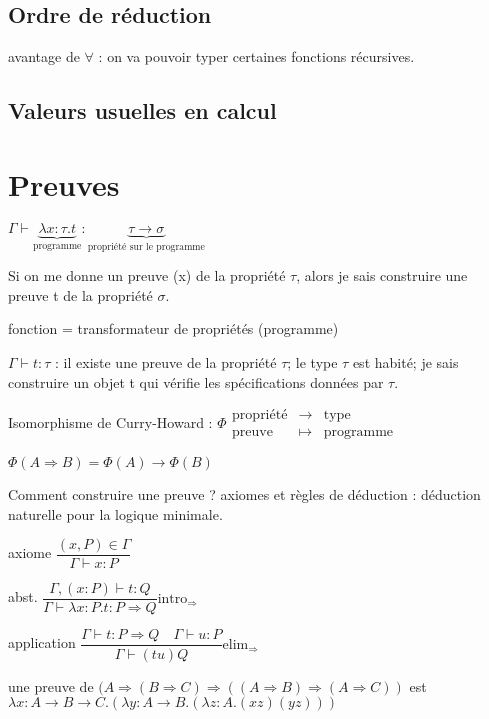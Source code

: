 \documentclass[10pt,a4paper]{article}
\begin{document}
\subsection{Ordre de réduction}
avantage de $\forall$ : on va pouvoir typer certaines fonctions récursives.

\subsection{Valeurs usuelles en \lambda calcul}

\section{Preuves}
$
\Gamma \vdash \underbrace{\lambda x : \tau . t}_{\text{programme}} : \underbrace{\tau → \sigma}_{\text{propriété sur le programme}}$

Si on me donne un preuve (x) de la propriété $\tau$, alors je sais construire une preuve t de la propriété $\sigma$.

fonction = transformateur de propriétés (programme)

$\Gamma \vdash t  : \tau$  : il existe une preuve de la propriété $\tau$; le type  $\tau$ est habité; je sais construire un objet t qui vérifie les spécifications données par $\tau$.

Isomorphisme de Curry-Howard :
$\Phi
\begin{array}{lll}
\text{propriété}& → & \text{type} \\
\text{preuve} &\mapsto&  \text{programme}
\end{array}$

$\Phi(A \Rightarrow B) = \Phi(A) → \Phi(B)$

Comment construire une preuve ?
axiomes et règles de déduction : déduction naturelle pour la logique minimale.

axiome $\dfrac{(x,P) \in \Gamma}{\Gamma \vdash x: P}$

abst. $\dfrac{\Gamma, (x:P) \vdash t:Q}{\Gamma  \vdash \lambda x:P.t : P \Rightarrow Q} \text{intro}_{\Rightarrow}$

application $\dfrac{\Gamma \vdash t : P \Rightarrow Q \quad \Gamma \vdash u:P}{\Gamma \vdash (t u) Q}\text{elim}_{\Rightarrow}$

\begin{ex}
 une preuve de $(A \Rightarrow (B \Rightarrow C) \Rightarrow (( A \Rightarrow B) \Rightarrow (A \Rightarrow C))$ est \\
$\lambda x : A → B → C . (\lambda y : A → B. ( \lambda z : A . (x z) (y z)))$
\end{ex}
\end{document}
